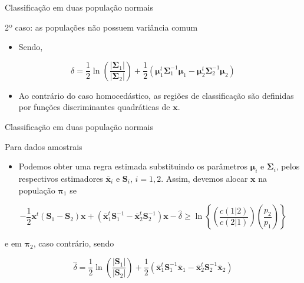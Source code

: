 \documentclass[
  ignorenonframetext,
  aspectratio=169,
]{beamer}
\providecommand{\tightlist}{%
  \setlength{\itemsep}{0pt}\setlength{\parskip}{0pt}}
\begin{document}
\begin{frame}{Classificação em duas população normais}
\label{classificauxe7uxe3o-em-duas-populauxe7uxe3o-normais-5}
\begin{block}{2º caso: as populações não possuem variância comum}
\label{uxba-caso-as-populauxe7uxf5es-nuxe3o-possuem-variuxe2ncia-comum-1}
\begin{itemize}
\tightlist
\item
  Sendo,
\end{itemize}

\[\delta = \dfrac{1}{2} \ln \left( \dfrac{|\boldsymbol{\Sigma}_1|}{|\boldsymbol{\Sigma}_2|} \right) + \dfrac{1}{2} \left( \boldsymbol{\mu}_1^t \boldsymbol{\Sigma}_1^{-1}\boldsymbol{\mu}_1 - \boldsymbol{\mu}_2^t \boldsymbol{\Sigma}_2^{-1}\boldsymbol{\mu}_2\right) \]

\begin{itemize}
\tightlist
\item
  Ao contrário do caso homocedástico, as regiões de classificação são
  definidas por funções discriminantes quadráticas de
  \(\boldsymbol{x}\).
\end{itemize}
\end{block}
\end{frame}

\begin{frame}{Classificação em duas população normais}
\label{classificauxe7uxe3o-em-duas-populauxe7uxe3o-normais-6}
\begin{block}{Para dados amostrais}
\label{para-dados-amostrais-1}
\begin{itemize}
\tightlist
\item
  Podemos obter uma regra estimada substituindo os parâmetros
  \(\boldsymbol{\mu}_i\) e \(\boldsymbol{\Sigma}_i\), pelos respectivos
  estimadores \(\bar{\boldsymbol{x}}_i\) e \(\boldsymbol{S}_i\),
  \(i = 1,2\). Assim, devemos alocar \(\boldsymbol{x}\) na população
  \(\boldsymbol{\pi}_1\) se
\end{itemize}

\[-\dfrac{1}{2} \boldsymbol{x}^t \left( \boldsymbol{S}_1 - \boldsymbol{S}_2\right) \boldsymbol{x} + \left( \bar{\boldsymbol{x}}_1^t \boldsymbol{S}_1^{-1} - \bar{\boldsymbol{x}}_2^t \boldsymbol{S}_2^{-1}\right) \boldsymbol{x} - \hat{\delta} \geqslant \ln \left\lbrace  \left( \dfrac{c(1|2)}{c(2|1)}\right) \left( \dfrac{p_2}{p_1}\right) \right\rbrace\]

e em \(\boldsymbol{\pi}_2\), caso contrário, sendo

\[\hat{\delta} = \dfrac{1}{2} \ln \left( \dfrac{|\boldsymbol{S}_1|}{|\boldsymbol{S}_2|} \right) + \dfrac{1}{2} \left( \bar{\boldsymbol{x}}_1^t \boldsymbol{S}_1^{-1}\bar{\boldsymbol{x}}_1 - \bar{\boldsymbol{x}}_2^t \boldsymbol{S}_2^{-1}\bar{\boldsymbol{x}}_2\right)
\]
\end{block}
\end{frame}
\end{document}
